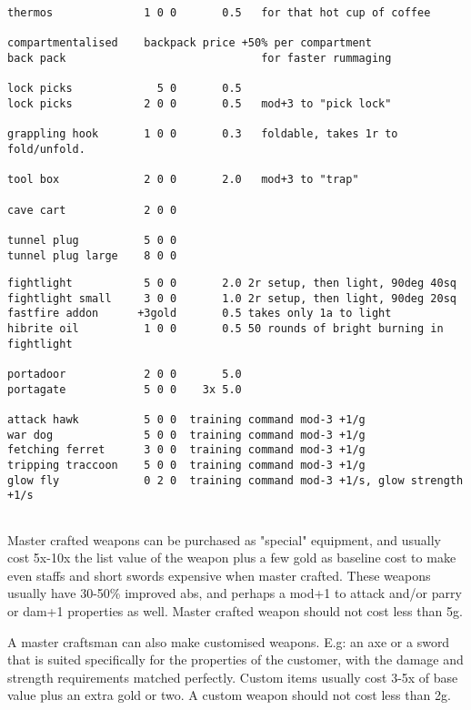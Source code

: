 \begin{verbatim}
thermos              1 0 0       0.5   for that hot cup of coffee

compartmentalised    backpack price +50% per compartment
back pack                              for faster rummaging

lock picks             5 0       0.5
lock picks           2 0 0       0.5   mod+3 to "pick lock"

grappling hook       1 0 0       0.3   foldable, takes 1r to fold/unfold.

tool box             2 0 0       2.0   mod+3 to "trap"

cave cart            2 0 0

tunnel plug          5 0 0
tunnel plug large    8 0 0

\end{verbatim} \pagebreak[1] \begin{verbatim}
fightlight           5 0 0       2.0 2r setup, then light, 90deg 40sq
fightlight small     3 0 0       1.0 2r setup, then light, 90deg 20sq
fastfire addon      +3gold       0.5 takes only 1a to light
hibrite oil          1 0 0       0.5 50 rounds of bright burning in fightlight

portadoor            2 0 0       5.0
portagate            5 0 0    3x 5.0

attack hawk          5 0 0  training command mod-3 +1/g
war dog              5 0 0  training command mod-3 +1/g
fetching ferret      3 0 0  training command mod-3 +1/g
tripping traccoon    5 0 0  training command mod-3 +1/g
glow fly             0 2 0  training command mod-3 +1/s, glow strength +1/s


\end{verbatim}
\normalsize

Master crafted weapons can be purchased as "special" equipment, and usually cost 5x-10x the list value of the weapon plus a few gold as baseline cost to make even staffs and short swords expensive when master crafted. These weapons usually have 30-50\% improved abs, and perhaps a mod+1 to attack and/or parry or dam+1 properties as well. Master crafted weapon should not cost less than 5g.

A master craftsman can also make customised weapons. E.g: an axe or a sword that is suited specifically for the properties of the customer, with the damage and strength requirements matched perfectly. Custom items usually cost 3-5x of base value plus an extra gold or two. A custom weapon should not cost less than 2g.

